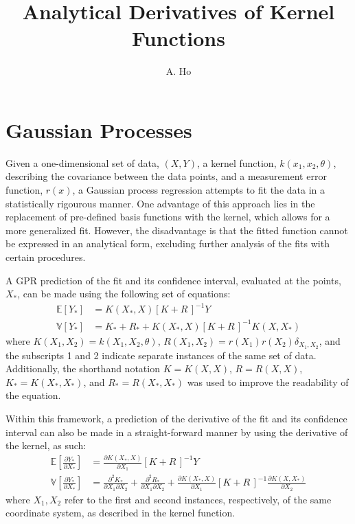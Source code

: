 \documentclass{article}
\title{Analytical Derivatives of Kernel Functions}
\author{A. Ho}
\begin{document}
	
\maketitle

\section{Gaussian Processes}
\label{sec:GPRegression}

Given a one-dimensional set of data, $\left(X,Y\right)$, a kernel function, $k\!\left(x_1,x_2,\theta\right)$, describing the covariance between the data points, and a measurement error function, $r\!\left(x\right)$, a Gaussian process regression attempts to fit the data in a statistically rigourous manner. One advantage of this approach lies in the replacement of pre-defined basis functions with the kernel, which allows for a more generalized fit. However, the disadvantage is that the fitted function cannot be expressed in an analytical form, excluding further analysis of the fits with certain procedures.

A GPR prediction of the fit and its confidence interval, evaluated at the points, $X_*$, can be made using the following set of equations:
\begin{equation}
\label{eq:GPRPrediction}
	\begin{aligned}
	\mathbb{E}\!\left[Y_*\right] &= K\!\left(X_*,X\right) \left[K + R\,\right]^{-1} Y \\
	\mathbb{V}\!\left[Y_*\right] &= K_* + R_* + K\!\left(X_*,X\right) \left[K + R\,\right]^{-1} K\!\left(X,X_*\right)
	\end{aligned}
\end{equation}
where $K\!\left(X_1,X_2\right) = k\!\left(X_1,X_2,\theta\right)$, $R\!\left(X_1,X_2\right) = r\!\left(X_1\right) r\!\left(X_2\right) \delta_{X_1,X_2}$, and the subscripts 1 and 2 indicate separate instances of the same set of data. Additionally, the shorthand notation $K = K\!\left(X,X\right)$, $R = R\!\left(X,X\right)$, $K_* = K\!\left(X_*,X_*\right)$, and $R_* = R\!\left(X_*,X_*\right)$ was used to improve the readability of the equation.

Within this framework, a prediction of the derivative of the fit and its confidence interval can also be made in a straight-forward manner by using the derivative of the kernel, as such:
\begin{equation}
\label{eq:GPRDerivativePrediction}
	\begin{aligned}
	\mathbb{E}\!\left[\frac{\partial Y_*}{\partial X_*}\right] &= \frac{\partial K\!\left(X_*,X\right)}{\partial X_1} \left[K + R\,\right]^{-1} Y \\
	\mathbb{V}\!\left[\frac{\partial Y_*}{\partial X_*}\right] &= \frac{\partial^2 K_*}{\partial X_1 \partial X_2} + \frac{\partial^2 R_*}{\partial X_1 \partial X_2} + \frac{\partial K\!\left(X_*,X\right)}{\partial X_1} \left[K + R\,\right]^{-1} \frac{\partial K\!\left(X,X_*\right)}{\partial X_2}
	\end{aligned}
\end{equation}
where $X_1,X_2$ refer to the first and second instances, respectively, of the same coordinate system, as described in the kernel function.
\end{document}
